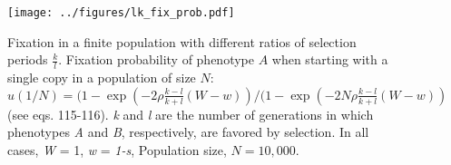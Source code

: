 \documentclass[]{article}
\begin{document}
\begin{figure}
\centering
\texttt{[image: ../figures/lk\_fix\_prob.pdf]}
\caption{Fixation in a finite population with different ratios of selection periods \(\frac{k}{l}\). Fixation probability of phenotype $A$ when starting with a single copy in a population of size $N$: $u(1/N) = (1-\exp(-2 \rho \frac{k-l}{k+l}(W-w))/(1-\exp(-2 N \rho \frac{k-l}{k+l}(W-w))$ (see eqs. 115-116).
\emph{k} and \emph{l} are the number of
generations in which phenotypes \emph{A} and \emph{B}, respectively, are favored by
selection. In all cases, \emph{W} = 1, \emph{w} = \emph{1-s}, Population size, \(N=10,000\).} \label{lk_fix_prob}
\end{figure}
\end{document}
